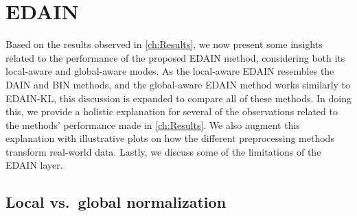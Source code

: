 \documentclass{statsmsc}
\begin{document}
{%
\section{EDAIN}%
\label{sec:EDAIN-discuss}

Based on the results observed in \cref{ch:Results},
we now present some insights related to the performance of the proposed
\ac{EDAIN} method, considering both its local-aware and global-aware modes.
As the local-aware \ac{EDAIN} resembles the
\ac{DAIN} and \ac{BIN} methods, and the global-aware \ac{EDAIN} method works similarly
to \ac{EDAIN-KL}, this discussion is expanded to compare all of these methods. In doing this,
we provide a holistic explanation for several of the observations related to
the methods' performance made in \cref{ch:Results}.
We also augment this explanation with illustrative plots on how the different preprocessing
methods transform real-world data.
Lastly, we discuss some of the limitations of the \ac{EDAIN} layer.

\subsection{Local vs.\ global normalization}%
\label{sub:local_vs_global}

}
\end{document}
